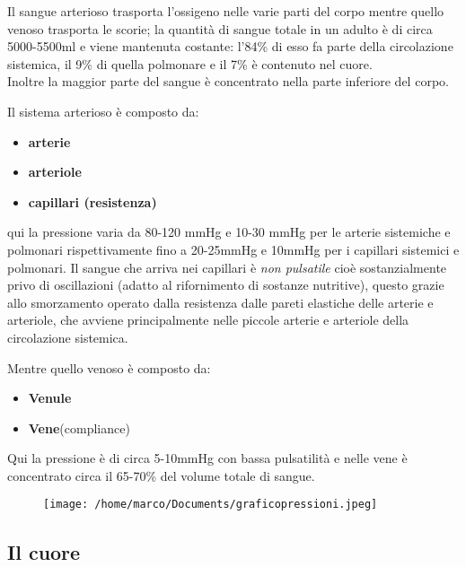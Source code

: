 \documentclass[10pt]{article}
\begin{document}
Il sangue arterioso trasporta l'ossigeno nelle varie parti del corpo mentre quello venoso trasporta le scorie; la quantità di sangue totale in un adulto è di circa 5000-5500ml e viene mantenuta costante: l'84\% di esso fa parte della circolazione sistemica, il 9\% di quella polmonare e il 7\% è contenuto nel cuore. \\
Inoltre la maggior parte del sangue è concentrato nella parte inferiore del corpo.

Il sistema arterioso è composto da:
\begin{itemize}
    \item \textbf{arterie}
    \item \textbf{arteriole}
    \item \textbf{capillari (resistenza)}
\end{itemize}
qui la pressione varia da 80-120 mmHg e 10-30 mmHg per le arterie sistemiche e polmonari rispettivamente fino a 20-25mmHg e 10mmHg per i capillari sistemici e polmonari.
Il sangue che arriva nei capillari è \textit{non pulsatile} cioè sostanzialmente privo di oscillazioni (adatto al rifornimento di sostanze nutritive), questo grazie allo smorzamento operato dalla resistenza dalle pareti elastiche delle arterie e arteriole, che avviene principalmente nelle piccole arterie e arteriole della circolazione sistemica.

Mentre quello venoso è composto da:
\begin{itemize}
    \item \textbf{Venule}
    \item \textbf{Vene}(compliance)
\end{itemize}
Qui la pressione è di circa 5-10mmHg con bassa pulsatilità e nelle vene è concentrato circa il 65-70\% del volume totale di sangue.

\begin{figure}[h!]
\centering
\texttt{[image: /home/marco/Documents/graficopressioni.jpeg]}
\label{fig:pressioni}
\end{figure}

\subsection{Il cuore}
\end{document}
